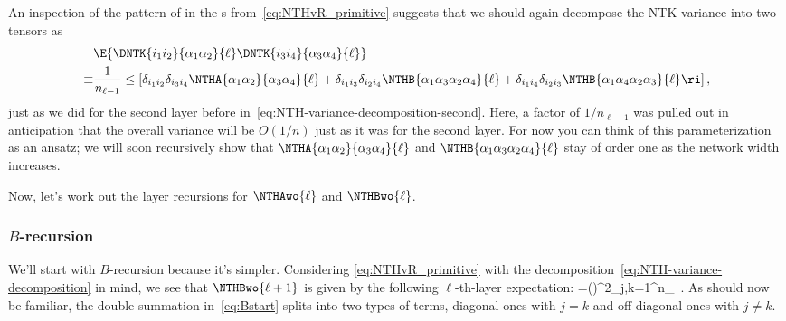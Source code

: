 An inspection of the pattern of  in the s from~\eqref{eq:NTHvR_primitive} suggests that we should again decompose the NTK variance into two tensors as
\begin{align}\label{eq:NTH-variance-decomposition}\index{tensor decomposition!NTK variance $A$/$B$}
&\E{\DNTK{i_1i_2}{\alpha_1\alpha_2}{\ell}\DNTK{i_3i_4}{\alpha_3\alpha_4}{\ell}}\, \\
\equiv&\frac{1}{n_{\ell-1}}\le[\delta_{i_1i_2}\delta_{i_3i_4} \NTHA{\alpha_1\alpha_2}{\alpha_3\alpha_4}{\ell} + \delta_{i_1i_3}\delta_{i_2i_4} \NTHB{\alpha_1\alpha_3\alpha_2\alpha_4}{\ell} + \delta_{i_1i_4}\delta_{i_2i_3} \NTHB{\alpha_1\alpha_4\alpha_2\alpha_3}{\ell} \ri] \, ,\notag
\end{align}
just as we did for the second layer before in~\eqref{eq:NTH-variance-decomposition-second}.
Here, a factor of $1/n_{\ell-1}$ was pulled out in anticipation that the overall variance will be $O(1/n)$ just as it was for the second layer.
For now you can think of this parameterization as an ansatz; we will soon recursively show that $\NTHA{\alpha_1\alpha_2}{\alpha_3\alpha_4}{\ell}$ and $\NTHB{\alpha_1\alpha_3\alpha_2\alpha_4}{\ell}$ stay of order one as the network width increases.%

Now, let's work out the layer recursions for $\NTHAwo{\ell}$ and $\NTHBwo{\ell}$.











\subsubsection{$B$-recursion}
We'll start with $B$-recursion because it's simpler.
Considering 
\eqref{eq:NTHvR_primitive} with the decomposition~\eqref{eq:NTH-variance-decomposition} in mind, we see that $\NTHBwo{\ell+1}$ is given by the following $\ell$-th-layer expectation:
\be\label{eq:Bstart}
=\le(\ri)^2\sum_{j,k=1}^{n_{\ell}}\, .
\ee
As should now be familiar, the double summation in~\eqref{eq:Bstart} splits into two types of terms, diagonal ones with $j=k$ and off-diagonal ones with $j\ne k$.


